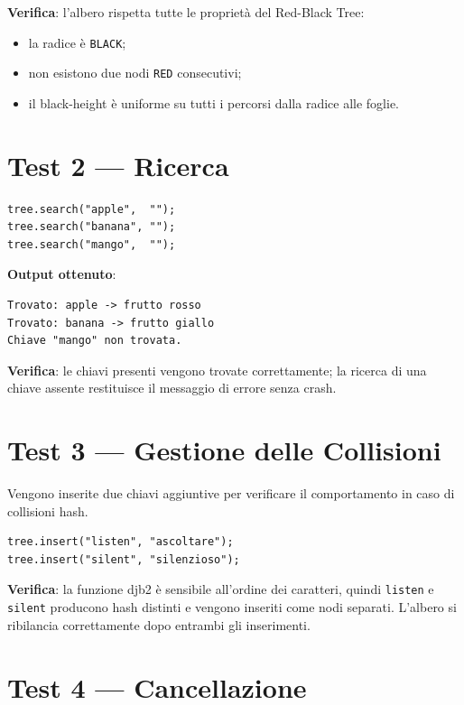 \textbf{Verifica}: l'albero rispetta tutte le proprietà del Red-Black Tree:
\begin{itemize}
    \item la radice è \texttt{BLACK};
    \item non esistono due nodi \texttt{RED} consecutivi;
    \item il black-height è uniforme su tutti i percorsi dalla radice 
    alle foglie.
\end{itemize}

\section{Test 2 --- Ricerca}

\begin{lstlisting}
tree.search("apple",  "");
tree.search("banana", "");
tree.search("mango",  "");
\end{lstlisting}

\textbf{Output ottenuto}:

\begin{lstlisting}
Trovato: apple -> frutto rosso
Trovato: banana -> frutto giallo
Chiave "mango" non trovata.
\end{lstlisting}

\textbf{Verifica}: le chiavi presenti vengono trovate correttamente; 
la ricerca di una chiave assente restituisce il messaggio di errore 
senza crash.

\section{Test 3 --- Gestione delle Collisioni}

Vengono inserite due chiavi aggiuntive per verificare il comportamento 
in caso di collisioni hash.

\begin{lstlisting}
tree.insert("listen", "ascoltare");
tree.insert("silent", "silenzioso");
\end{lstlisting}

\textbf{Verifica}: la funzione djb2 è sensibile all'ordine dei caratteri, 
quindi \texttt{listen} e \texttt{silent} producono hash distinti e vengono 
inseriti come nodi separati. L'albero si ribilancia correttamente dopo 
entrambi gli inserimenti.

\section{Test 4 --- Cancellazione}

